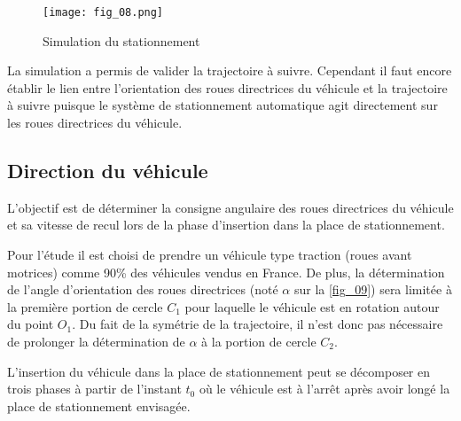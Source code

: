 \begin{figure}[H]
\centering
\texttt{[image: fig\_08.png]}
\caption{Simulation du stationnement \label{fig_08}}
\end{figure}


La simulation a permis de valider la trajectoire à suivre. Cependant il faut encore établir le lien entre l’orientation
des roues directrices du véhicule et la trajectoire à suivre puisque le système de stationnement automatique agit
directement sur les roues directrices du véhicule.

\subsection{Direction du véhicule}

\begin{obj}
L’objectif est de déterminer la consigne angulaire des roues directrices du véhicule et sa vitesse de
recul lors de la phase d’insertion dans la place de stationnement.
\end{obj}


Pour l’étude il est choisi de prendre un véhicule type traction (roues avant motrices) comme 90\% des véhicules
vendus en France. De plus, la détermination de l’angle d’orientation des roues directrices (noté $\alpha$ sur la \autoref{fig_09})
sera limitée à la première portion de cercle $C_1$ pour laquelle le véhicule est en rotation autour du point $O_1$. Du
fait de la symétrie de la trajectoire, il n’est donc pas nécessaire de prolonger la détermination de $\alpha$ à la portion
de cercle $C_2$.

L’insertion du véhicule dans la place de stationnement peut se décomposer en trois phases à partir de l’instant
$t_0$ où le véhicule est à l’arrêt après avoir longé la place de stationnement envisagée.


